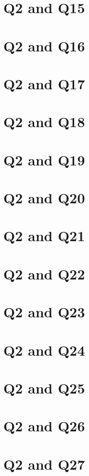 \documentclass{report}
\begin{document}
\section{Q2 and Q15}\clearpage
\section{Q2 and Q16}\clearpage
\section{Q2 and Q17}\clearpage
\section{Q2 and Q18}\clearpage
\section{Q2 and Q19}\clearpage
\section{Q2 and Q20}\clearpage
\section{Q2 and Q21}\clearpage
\section{Q2 and Q22}\clearpage
\section{Q2 and Q23}\clearpage
\section{Q2 and Q24}\clearpage
\section{Q2 and Q25}\clearpage
\section{Q2 and Q26}\clearpage
\section{Q2 and Q27}\clearpage
\end{document}
